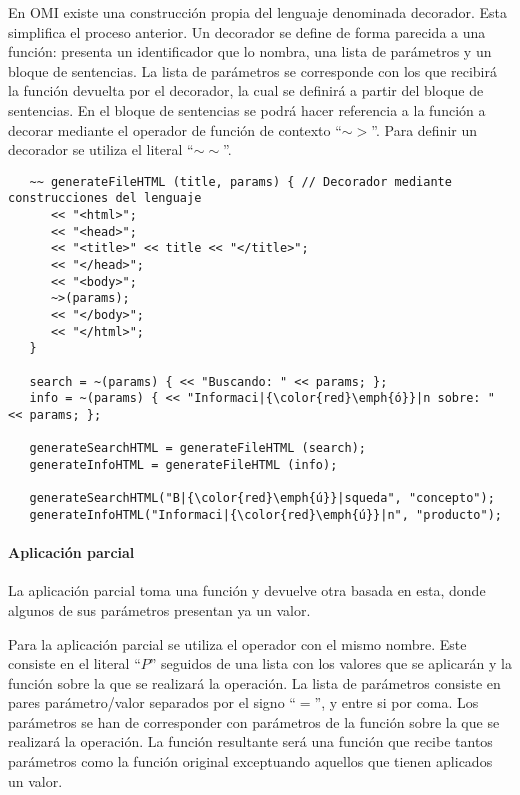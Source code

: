 En OMI existe una construcción propia del lenguaje denominada decorador. Esta simplifica el 
proceso anterior. Un decorador se define de forma parecida a una función: presenta un identificador 
que lo nombra, una lista de parámetros y un bloque de sentencias. La lista de parámetros se corresponde 
con los que recibirá la función devuelta por el decorador, la cual se definirá a partir del 
bloque de sentencias. En el bloque de sentencias se podrá hacer referencia a la función a 
decorar mediante el operador de función de contexto ``$\sim>$''. Para definir un decorador se utiliza
el literal ``$\sim\sim$''. \\

\begin{lstlisting}
   ~~ generateFileHTML (title, params) { // Decorador mediante construcciones del lenguaje
      << "<html>";
      << "<head>";
      << "<title>" << title << "</title>";
      << "</head>";
      << "<body>";
      ~>(params);
      << "</body>";
      << "</html>";
   }
   
   search = ~(params) { << "Buscando: " << params; };
   info = ~(params) { << "Informaci|{\color{red}\emph{ó}}|n sobre: " << params; };
   
   generateSearchHTML = generateFileHTML (search);
   generateInfoHTML = generateFileHTML (info);
   
   generateSearchHTML("B|{\color{red}\emph{ú}}|squeda", "concepto");
   generateInfoHTML("Informaci|{\color{red}\emph{ú}}|n", "producto");
\end{lstlisting}
\paragraph{Aplicación parcial}

La aplicación parcial toma una función y devuelve otra basada en esta, donde algunos de sus parámetros presentan ya un valor.

Para la aplicación parcial se utiliza el operador con el mismo nombre. Este consiste en el literal ``$P$'' seguidos de 
una lista con los valores que se aplicarán y la función sobre la que se realizará la operación. La lista de parámetros consiste 
en pares parámetro/valor separados por el signo ``$=$'', y entre si por coma. Los parámetros se han de corresponder con parámetros de
la función sobre la que se realizará la operación. La función resultante será una función que recibe tantos parámetros como la función original
exceptuando aquellos que tienen aplicados un valor. \\ 

